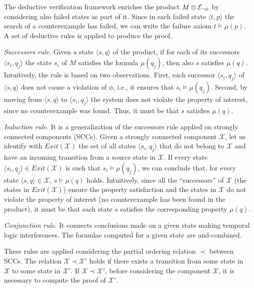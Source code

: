The deductive verification framework enriches the product $M \otimes \mathcal{E}_{\lnot\phi}$ by considering also failed states as part of it.
Since in each failed state $\langle t,p \rangle$ the search of a counterexample has failed, we can write the failure axiom $t\models \mu(p)$.
A set of deductive rules is applied to produce the proof.
\begin{enumerate*}[label={(\arabic*)}]
\item \emph{Successors rule.} Given a state $\langle s, q\rangle$ of the product, if for each of its successors $\langle s_i, q_j\rangle$ the state $s_i$ of $M$ satisfies the formula $\mu(q_j)$, then also $s$ satisfies $\mu(q)$.
Intuitively, the rule is based on two observations.
First, each successor  $\langle s_i, q_j\rangle$ of  $\langle s, q\rangle$ does not cause a violation of $\phi$, i.e., it ensures that $s_i \models \mu(q_j)$.
Second, by moving from $\langle s, q\rangle$ to $\langle s_i, q_j\rangle$ the system does not violate the property of interest, since no counterexample was found.
Thus, it must be that $s$ satisfies $\mu(q)$.
\item \emph{Induction rule.} It is a generalization of the successors rule applied on strongly connected components (SCCs). 
Given a strongly connected component $\mathcal{X}$, let us identify with $Exit(\mathcal{X})$ the set of all states $\langle s_i, q_j\rangle$ that do not belong to $\mathcal{X}$ and have an incoming transition from a source state in $\mathcal{X}$.
If every state $\langle s_i, q_j\rangle \in Exit(\mathcal{X})$ is such that $s_i \models \mu(q_j)$, we can conclude that, for every state $\langle s, q \rangle \in \mathcal{X}$, $s \models \mu(q)$ holds.
Intuitively, since all the ``successors'' of $\mathcal{X}$ (the states in $Exit(\mathcal{X})$) ensure the property satisfaction and the states in $\mathcal{X}$ do not violate the property of interest (no counterexample has been found in the product), it must be that each state $s$ satisfies the corresponding property $\mu(q)$. 
\item \emph{Conjunction rule.} It connects conclusions made on a given state making temporal logic interferences. 
The formulae computed for a given state are and-combined.
\end{enumerate*}

These rules are applied considering the partial ordering relation $\prec$ between SCCs. 
The relation $\mathcal{X} \prec \mathcal{X}'$ holds if there exists a transition from some state in $\mathcal{X}$ to some state in $\mathcal{X}'$. 
If $\mathcal{X} \prec \mathcal{X}'$, before considering the component  $\mathcal{X}$, it is necessary to compute the proof of $\mathcal{X}'$.

